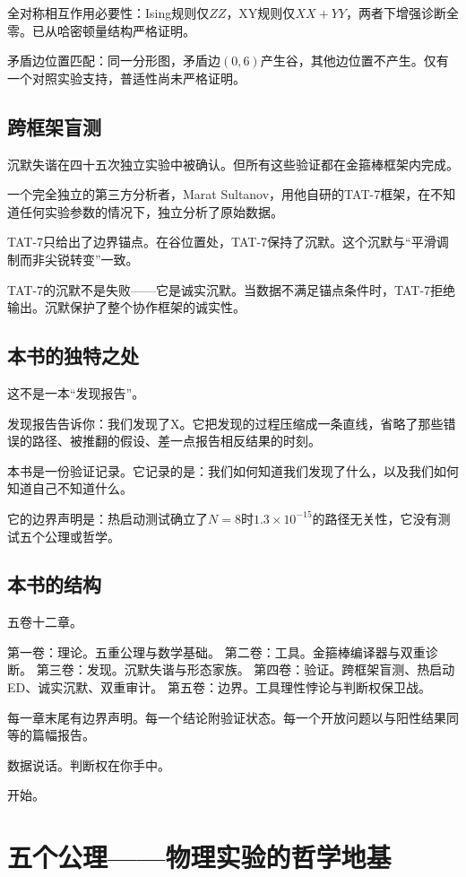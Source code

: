 \documentclass[11pt,a4paper]{book}
\theoremstyle{definition}
\begin{document}
全对称相互作用必要性：Ising规则仅$ZZ$，XY规则仅$XX+YY$，两者下增强诊断全零。已从哈密顿量结构严格证明。

矛盾边位置匹配：同一分形图，矛盾边$(0,6)$产生谷，其他边位置不产生。仅有一个对照实验支持，普适性尚未严格证明。

\section*{跨框架盲测}

沉默失谐在四十五次独立实验中被确认。但所有这些验证都在金箍棒框架内完成。

一个完全独立的第三方分析者，Marat Sultanov，用他自研的TAT-7框架，在不知道任何实验参数的情况下，独立分析了原始数据。

TAT-7只给出了边界锚点。在谷位置处，TAT-7保持了沉默。这个沉默与“平滑调制而非尖锐转变”一致。

TAT-7的沉默不是失败——它是诚实沉默。当数据不满足锚点条件时，TAT-7拒绝输出。沉默保护了整个协作框架的诚实性。

\section*{本书的独特之处}

这不是一本“发现报告”。

发现报告告诉你：我们发现了X。它把发现的过程压缩成一条直线，省略了那些错误的路径、被推翻的假设、差一点报告相反结果的时刻。

本书是一份验证记录。它记录的是：我们如何知道我们发现了什么，以及我们如何知道自己不知道什么。

它的边界声明是：热启动测试确立了$N=8$时$1.3\times10^{-15}$的路径无关性，它没有测试五个公理或哲学。

\section*{本书的结构}

五卷十二章。

第一卷：理论。五重公理与数学基础。
第二卷：工具。金箍棒编译器与双重诊断。
第三卷：发现。沉默失谐与形态家族。
第四卷：验证。跨框架盲测、热启动ED、诚实沉默、双重审计。
第五卷：边界。工具理性悖论与判断权保卫战。

每一章末尾有边界声明。每一个结论附验证状态。每一个开放问题以与阳性结果同等的篇幅报告。

数据说话。判断权在你手中。

开始。

\chapter{五个公理——物理实验的哲学地基}
\end{document}
